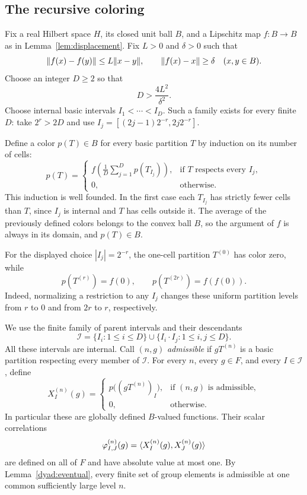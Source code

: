 \subsection{The recursive coloring}\label{sec:coloring}

Fix a real Hilbert space $H$, its closed unit ball $B$, and a
Lipschitz map $f:B\to B$ as in Lemma~\ref{lem:displacement}.  Fix
$L>0$ and $\delta>0$ such that
\begin{equation}\label{color:map}
  \lVert f(x)-f(y)\rVert\leq L\lVert x-y\rVert,\qquad
  \lVert f(x)-x\rVert\geq\delta
  \quad(x,y\in B).
\end{equation}
Choose an integer $D\geq2$ so that
\begin{equation}\label{color:parameters}
  D>\frac{4L^2}{\delta^2}.
\end{equation}
Choose internal basic intervals $I_1<\cdots<I_D$.  Such a family
exists for every finite $D$: take $2^r>2D$ and use
$I_j=[(2j-1)2^{-r},2j2^{-r}]$.

Define a color $p(T)\in B$ for every basic partition $T$ by induction
on its number of cells:
\begin{equation}\label{color:recursion}
  p(T)=
  \begin{cases}
  \displaystyle f\left(\frac1D\sum_{j=1}^D p(T_{I_j})\right),
       &\text{if $T$ respects every $I_j$},\\[6pt]
  0,   &\text{otherwise}.
  \end{cases}
\end{equation}
This induction is well founded.  In the first case each $T_{I_j}$
has strictly fewer cells than $T$, since $I_j$ is internal and $T$
has cells outside it.  The average of the previously defined
colors belongs to the convex ball $B$, so the argument of $f$ is
always in its domain, and $p(T)\in B$.

For the displayed choice $|I_j|=2^{-r}$, the one-cell partition
$T^{(0)}$ has color zero, while
\[
  p(T^{(r)})=f(0),\qquad
  p(T^{(2r)})=f(f(0)).
\]
Indeed, normalizing a restriction to any $I_j$ changes these uniform
partition levels from $r$ to $0$ and from $2r$ to $r$, respectively.

We use the finite family of parent intervals and their descendants
\[
  \mathcal I=\{I_i:1\leq i\leq D\}
       \cup\{I_i\cdot I_j:1\leq i,j\leq D\}.
\]
All these intervals are internal.  Call $(n,g)$ \emph{admissible}
if $gT^{(n)}$ is a basic partition respecting every member of
$\mathcal I$.  For every $n$, every $g\in F$, and every
$I\in\mathcal I$, define
\begin{equation}\label{color:global}
  X_I^{(n)}(g)=
  \begin{cases}
    p\bigl((gT^{(n)})_I\bigr),&\text{if $(n,g)$ is admissible},\\
    0,&\text{otherwise}.
  \end{cases}
\end{equation}
In particular these are globally defined $B$-valued functions.
Their scalar correlations
\[
  \varphi_{I,J}^{(n)}(g)
     =\langle X_I^{(n)}(g),X_J^{(n)}(g)\rangle
\]
are defined on all of $F$ and have absolute value at most one.
By Lemma~\ref{dyad:eventual}, every finite set of group elements is
admissible at one common sufficiently large level $n$.

